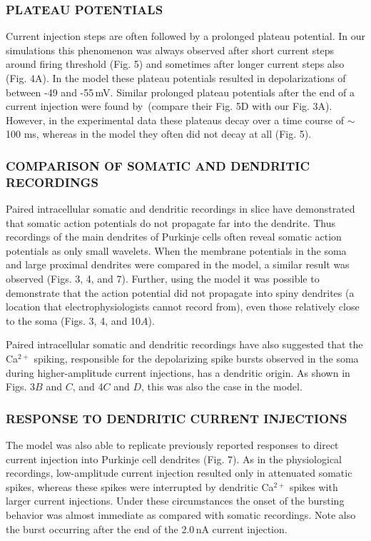 \documentclass[12pt]{article}
\begin{document}
\subsubsection*{PLATEAU POTENTIALS}

Current injection steps are often followed by a prolonged plateau potential. In our simulations this phenomenon was always observed after short current steps around firing threshold (Fig. 5) and sometimes after longer current steps also (Fig. 4A). In the model these plateau potentials resulted in depolarizations of between -49 and -55\,mV. Similar prolonged plateau potentials after the end of a current injection were found by\,\cite{R:1980ly} (compare their Fig. 5D with our Fig. 3A). However, in the experimental data these plateaus decay over a time course of $\sim$\,100 ms, whereas in the model they often did not decay at all (Fig. 5).

\subsubsection*{COMPARISON OF SOMATIC AND DENDRITIC RECORDINGS}

Paired intracellular somatic and dendritic recordings in slice have demonstrated that somatic action potentials do not propagate far into the dendrite. Thus recordings of the main dendrites of Purkinje cells often reveal somatic action potentials as only small wavelets. When the membrane potentials in the soma and large proximal dendrites were compared in the model, a similar result was observed (Figs. 3, 4, and 7). Further, using the model it was possible to demonstrate that the action potential did not propagate into spiny dendrites (a location that electrophysiologists cannot record from), even those relatively close to the soma (Figs. 3, 4, and 10$A$).

Paired intracellular somatic and dendritic recordings have also suggested that the Ca$^{2+}$ spiking, responsible for the depolarizing spike bursts observed in the soma during higher-amplitude current injections, has a dendritic origin. As shown in Figs. 3$B$ and $C$, and 4$C$ and $D$, this was also the case in the model.

\subsubsection*{RESPONSE TO DENDRITIC CURRENT INJECTIONS}

The model was also able to replicate previously reported responses to direct current injection into Purkinje cell dendrites (Fig. 7). As in the physiological recordings, low-amplitude current injection resulted only in attenuated somatic spikes, whereas these spikes were interrupted by dendritic Ca$^{2+}$ spikes with larger current injections. Under these circumstances the onset of the bursting behavior was almost immediate as compared with somatic recordings. Note also the burst occurring after the end of the 2.0\,nA current injection.
\end{document}
